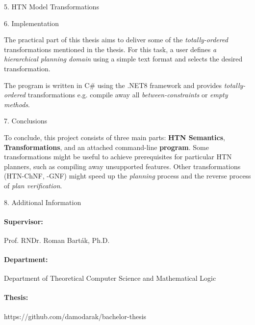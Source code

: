 \documentclass[portrait,a0paper,fontscale=0.25]{baposter}
\begin{document}
\begin{poster}
\begin{posterbox}[column=1, name=trans]{5. HTN Model Transformations}
\end{posterbox}

\begin{posterbox}[column=1, name=implementation, below=trans]{6. Implementation}

The practical part of this thesis aims to deliver some of the \emph{totally-ordered} transformations mentioned in the thesis. For this task, a user defines \emph{a hierarchical planning domain} using a simple text format and selects the desired transformation.

\vspace{5mm}

The program is written in C\# using the .NET8 framework and provides \emph{totally-ordered} transformations e.g. compile away all \emph{between-constraints} or \emph{empty methods}.


\end{posterbox}

\begin{posterbox}[column=1, name=conclusion, below=implementation, headerColorOne=green!59!yellow, boxColorOne=green!10]{7. Conclusions}

To conclude, this project consists of three main parts: \textbf{HTN Semantics}, \textbf{Transformations}, and an attached command-line \textbf{program}. Some transformations might be useful to achieve prerequisites for particular HTN planners, such as compiling away unsupported features. Other transformations (HTN-ChNF, -GNF) might speed up the \emph{planning} process and the reverse process of \emph{plan verification}.

\end{posterbox}

\begin{posterbox}[column=1, name=info, below=conclusion]{8. Additional Information}

\paragraph{Supervisor:} Prof. RNDr. Roman Barták, Ph.D.
\paragraph{Department:} Department of Theoretical Computer Science and Mathematical Logic
\paragraph{Thesis:} https://github.com/damodarak/bachelor-thesis

\end{posterbox}

\end{poster}
\end{document}
